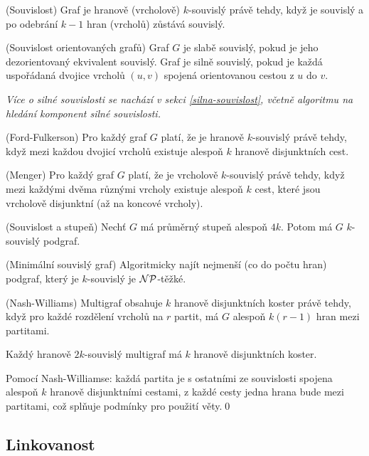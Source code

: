 \df (Souvislost) Graf je hranově (vrcholově) $k$-souvislý právě tehdy, když je 
souvislý a po odebrání $k-1$ hran (vrcholů) zůstává souvislý.

\df (Souvislost orientovaných grafů) Graf $G$ je slabě souvislý, pokud je jeho 
dezorientovaný ekvivalent souvislý. Graf je silně souvislý, pokud je každá uspořádaná dvojice vrcholů $(u,v)$ spojená orientovanou cestou z $u$ do $v$.

{\it Více o silné souvislosti se nachází v sekci \ref{silna-souvislost}, včetně 
algoritmu na hledání komponent silné souvislosti.}

\vt (Ford-Fulkerson) Pro každý graf $G$ platí, že je hranově $k$-souvislý právě 
tehdy, když mezi každou dvojicí vrcholů existuje alespoň $k$ hranově 
disjunktních cest.

\vt (Menger) Pro každý graf $G$ platí, že je vrcholově $k$-souvislý právě 
tehdy, když mezi každými dvěma různými vrcholy existuje alespoň $k$ cest, které 
jsou vrcholově disjunktní (až na koncové vrcholy).

\vt (Souvislost a stupeň) Nechť $G$ má průměrný stupeň alespoň $4k$. Potom má 
$G$ $k$-souvislý podgraf.

\vt (Minimální souvislý graf) Algoritmicky najít nejmenší (co do počtu hran) 
podgraf, který je $k$-souvislý je $\mathcal{NP}$-těžké.

%
%

\vt (Nash-Williams) Multigraf obsahuje $k$ hranově disjunktních koster právě
tehdy, když pro každé rozdělení vrcholů na $r$ partit, má $G$ alespoň $k(r-1)$
hran mezi partitami.

\vt Každý hranově $2k$-souvislý multigraf má $k$ hranově disjunktních koster.

\dk Pomocí Nash-Williamse: každá partita je s ostatními ze souvislosti spojena
alespoň $k$ hranově disjunktními cestami, z každé cesty jedna hrana bude mezi
partitami, což splňuje podmínky pro použití věty.\qed

\subsection{Linkovanost}

